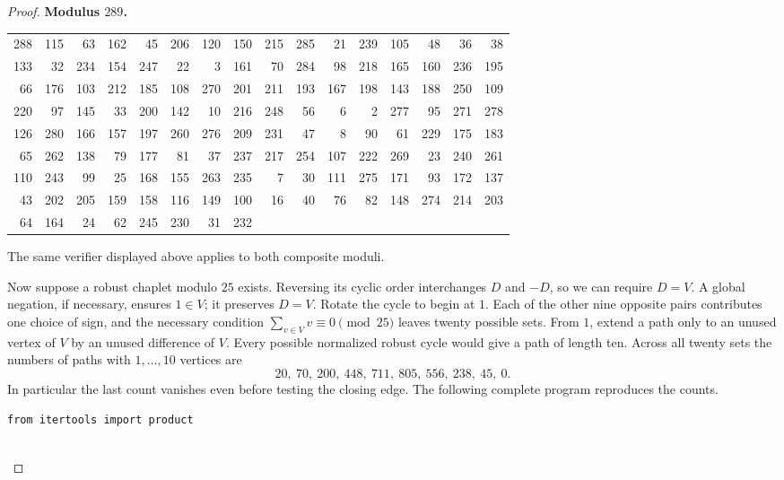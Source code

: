 \documentclass[11pt,a4paper]{article}
\begin{document}
\begin{proof}
\par\noindent\begin{minipage}{\linewidth}
\noindent\textbf{Modulus $289$.}\par\smallskip
{\small\centering\setlength{\tabcolsep}{3pt}
\begin{tabular}{*{16}{r}}
288 & 115 & 63 & 162 & 45 & 206 & 120 & 150 & 215 & 285 & 21 & 239 & 105 & 48 & 36 & 38 \\
133 & 32 & 234 & 154 & 247 & 22 & 3 & 161 & 70 & 284 & 98 & 218 & 165 & 160 & 236 & 195 \\
66 & 176 & 103 & 212 & 185 & 108 & 270 & 201 & 211 & 193 & 167 & 198 & 143 & 188 & 250 & 109 \\
220 & 97 & 145 & 33 & 200 & 142 & 10 & 216 & 248 & 56 & 6 & 2 & 277 & 95 & 271 & 278 \\
126 & 280 & 166 & 157 & 197 & 260 & 276 & 209 & 231 & 47 & 8 & 90 & 61 & 229 & 175 & 183 \\
65 & 262 & 138 & 79 & 177 & 81 & 37 & 237 & 217 & 254 & 107 & 222 & 269 & 23 & 240 & 261 \\
110 & 243 & 99 & 25 & 168 & 155 & 263 & 235 & 7 & 30 & 111 & 275 & 171 & 93 & 172 & 137 \\
43 & 202 & 205 & 159 & 158 & 116 & 149 & 100 & 16 & 40 & 76 & 82 & 148 & 274 & 214 & 203 \\
64 & 164 & 24 & 62 & 245 & 230 & 31 & 232 \\
\end{tabular}\par}
\end{minipage}\par

\smallskip
The same verifier displayed above applies to both composite moduli.

Now suppose a robust chaplet modulo $25$ exists. Reversing its cyclic order interchanges $D$ and $-D$, so we can require $D=V$. A global negation, if necessary, ensures $1\in V$; it preserves $D=V$. Rotate the cycle to begin at $1$. Each of the other nine opposite pairs contributes one choice of sign, and the necessary condition $\sum_{v\in V}v\equiv0\pmod{25}$ leaves twenty possible sets. From $1$, extend a path only to an unused vertex of $V$ by an unused difference of $V$. Every possible normalized robust cycle would give a path of length ten. Across all twenty sets the numbers of paths with $1,\ldots,10$ vertices are
\[
       20,\ 70,\ 200,\ 448,\ 711,\ 805,\ 556,\ 238,\ 45,\ 0.
\]
In particular the last count vanishes even before testing the closing edge. The following complete program reproduces the counts.
\begin{verbatim}
from itertools import product


\end{verbatim}
\end{proof}
\end{document}
